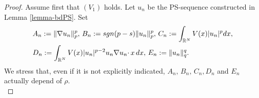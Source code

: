 \documentclass[10pt,a4paper]{amsart}
\newcommand{\rn}{\mathbb{R}^N}
\begin{document}
\begin{proof}
Assume first that $(V_1)$ holds. Let $u_n$ be the PS-sequence  constructed in Lemma \ref{lemma-bdPS}. Set
\begin{equation}
\begin{aligned}
&A_n:=\|\nabla u_n\|_p^p,\,B_n:={\rm sgn}(p-s)\|u_n\|^p_p,\,C_n:=\int_{\rn}V(x)|u_n|^pdx,\\
&D_n:=\int_{\rn}V(x)|u_n|^{p-2}u_n\nabla u_n\cdotp x\, dx,\, E_n:=\|u_n\|_q^q.    
\end{aligned}
\end{equation}
We stress that, even if it is not explicitly indicated, $A_n,\, B_n,\, C_n,D_n$ and $E_n$ actually depend of $\rho$. \\


\end{proof}
\end{document}
